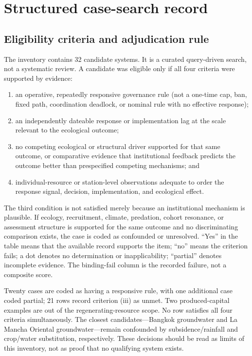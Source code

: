 \section{Structured case-search record}\label{si:cases}

\subsection{Eligibility criteria and adjudication rule}

The inventory contains 32 candidate systems. It is a curated query-driven search, not a systematic review. A candidate was eligible only if all four criteria were supported by evidence:
\begin{enumerate}
\item an operative, repeatedly responsive governance rule (not a one-time cap, ban, fixed path, coordination deadlock, or nominal rule with no effective response);
\item an independently dateable response or implementation lag at the scale relevant to the ecological outcome;
\item no competing ecological or structural driver supported for that same outcome, or comparative evidence that institutional feedback predicts the outcome better than prespecified competing mechanisms; and
\item individual-resource or station-level observations adequate to order the response signal, decision, implementation, and ecological effect.
\end{enumerate}
The third condition is not satisfied merely because an institutional mechanism is plausible. If ecology, recruitment, climate, predation, cohort resonance, or assessment structure is supported for the same outcome and no discriminating comparison exists, the case is coded as confounded or unresolved. ``Yes'' in the table means that the available record supports the item; ``no'' means the criterion fails; a dot denotes no determination or inapplicability; ``partial'' denotes incomplete evidence. The binding-fail column is the recorded failure, not a composite score.

Twenty cases are coded as having a responsive rule, with one additional case coded partial; 21 rows record criterion (iii) as unmet. Two produced-capital examples are out of the regenerating-resource scope. No row satisfies all four criteria simultaneously. The closest candidates—Bangkok groundwater and La Mancha Oriental groundwater—remain confounded by subsidence/rainfall and crop/water substitution, respectively. These decisions should be read as limits of this inventory, not as proof that no qualifying system exists.

